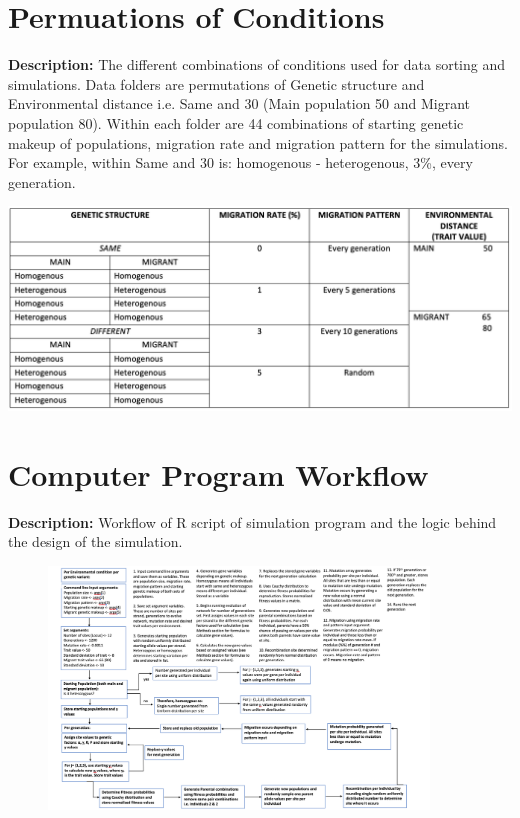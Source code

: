 \documentclass[11pt]{article}
\begin{document}
\begin{appendices}
\section{Permuations of Conditions}
\textbf{Description:} The different combinations of conditions used for data sorting and simulations. Data folders are permutations of Genetic structure and Environmental distance i.e. Same and 30 (Main population 50 and Migrant population 80). Within each folder are 44 combinations of starting genetic makeup of populations, migration rate and migration pattern for the simulations. For example, within Same and 30 is: homogenous - heterogenous, 3\%, every generation.
\begin{table}[h]
\centering
\includegraphics[scale=0.40]{../Results/AppendixI_conditions.jpg}
\end{table}

\newpage

\section{Computer Program Workflow}
\textbf{Description:} Workflow of R script of simulation program and the logic behind the design of the simulation.
\begin{figure}[h]
\centering
    \includegraphics[width=0.9\textwidth]{../Results/workflow.jpg}
\end{figure}


\end{appendices}
\end{document}
